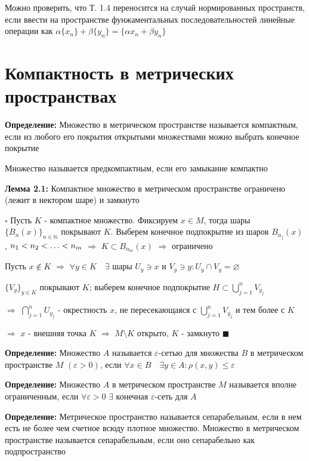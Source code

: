 \documentclass[a4paper]{report}
\newcommand*{\hm}[1]{#1\nobreak\discretionary{}%
            {\hbox{$\mathsurround=0pt #1$}}{}}
\begin{document}
Можно проверить, что Т. 1.4 переносится на случай нормированных пространств, если ввести на пространстве фунжаментальных
последовательностей линейные операции как $\alpha\{x_n\}+\beta\{y_n\}=\{\alpha x_n+\beta y_n\}$








\chapter{Компактность в метрических пространствах}

\noindent\textbf{Определение:} Множество в метрическом пространстве называется компактным, если из любого его покрытия
открытыми множествами можно выбрать конечное покрытие

Множество называется предкомпактным, если его замыкание компактно
\bigskip

\noindent\textbf{Лемма 2.1:} Компактное множество в метрическом пространстве ограничено (лежит в нектором шаре) и замкнуто

\noindent $\square$ Пусть $K$ - компактное множество. Фиксируем $x\in M$, тогда шары $\{B_n(x)\}_{n\in\mathbb N}$
покрывают $K$. Выберем конечное подпокрытие из шаров $B_{n_j}(x)$, $n_1<n_2\hm<\ldots<n_m$ $\Rightarrow$ $K\subset
B_{n_m}(x)$ $\Rightarrow$ ограничено

Пусть $x\notin K$ $\Rightarrow$ $\forall y\in K\quad\exists$ шары $U_y\ni x$ и $V_y\ni y\colon U_y\cap V_y=\varnothing$

$\{V_y\}_{y\in K}$ покрывают $K$; выберем конечное подпокрытие $H\subset\bigcup\limits_{j=1}^n V_{y_j}$

$\Rightarrow$
$\bigcap\limits_{j=1}^n U_{y_j}$ - окрестность $x$, не пересекающаяся с $\bigcup\limits_{j=1}^n V_{y_j}$ и тем более с $K$

$\Rightarrow$ $x$ - внешняя точка $K$ $\Rightarrow$ $M\setminus K$ открыто, $K$ - замкнуто $\blacksquare$
\bigskip

\noindent\textbf{Определение:} Множество $A$ называется $\varepsilon$-сетью для множества $B$ в метрическом пространстве
$M$ $(\varepsilon>0)$, если $\forall x\in B\quad\exists y\in A\colon\rho(x,y)\le\varepsilon$
\bigskip

\noindent\textbf{Определение:} Множество $A$ в метрическом пространстве $M$ называется вполне ограниченным, если $\forall
\varepsilon>0$ $\exists$ конечная $\varepsilon$-сеть для $A$
\bigskip

\noindent\textbf{Определение:} Метрическое пространство называется сепарабельным, если в нем есть не более чем счетное
всюду плотное множество. Множество в метрическом пространстве называется сепарабельным, если оно сепарабельно как
подпространство
\bigskip
\end{document}
